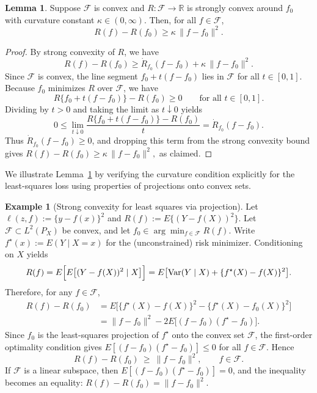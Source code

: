 \documentclass[11pt]{article}
\theoremstyle{plain}
\theoremstyle{definition} %
\newtheorem{example}{Example} %
\newtheorem{lemma}{Lemma}
\newcommand{\Var}{\operatorname{Var}}
\begin{document}
\begin{lemma} \label{lemma::strongconvexity}
Suppose $\mathcal F$ is convex and $R:\mathcal F\to\mathbb R$ is strongly convex around $f_0$ with curvature constant $\kappa\in(0,\infty)$. Then, for all $f\in\mathcal F$,
\[
R(f)-R(f_0)\ge \kappa\,\|f-f_0\|^2.
\]
\end{lemma}
\begin{proof}
By strong convexity of $R$, we have
\[
R(f)-R(f_0)\ge \dot R_{f_0}(f-f_0) + \kappa\,\|f-f_0\|^2.
\]
Since $\mathcal F$ is convex, the line segment $f_0+t(f-f_0)$ lies in $\mathcal F$ for all $t\in[0,1]$. Because $f_0$ minimizes $R$ over $\mathcal F$, we have
\[
R\{f_0+t(f-f_0)\}-R(f_0)\ge 0
\qquad\text{for all }t\in[0,1].
\]
Dividing by $t>0$ and taking the limit as $t\downarrow 0$ yields
\[
0 \le \lim_{t\downarrow 0}\frac{R\{f_0+t(f-f_0)\}-R(f_0)}{t}
= \dot R_{f_0}(f-f_0).
\]
Thus $\dot R_{f_0}(f-f_0)\ge 0$, and dropping this term from the strong convexity bound gives $R(f)-R(f_0)\ge \kappa\,\|f-f_0\|^2,$
as claimed.
\end{proof}

We illustrate Lemma~\ref{lemma::strongconvexity} by verifying the curvature condition explicitly for the least-squares loss using properties of projections onto convex sets.


\begin{example}[Strong convexity for least squares via projection]
Let \(\ell(z,f):=\{y-f(x)\}^2\) and \(R(f):=E\{(Y-f(X))^2\}\). Let \(\mathcal F\subset L^2(P_X)\) be convex, and let
\(f_0\in\arg\min_{f\in\mathcal F} R(f)\). Write \(f^\star(x):=E(Y\mid X=x)\) for the (unconstrained) risk minimizer. Conditioning on \(X\) yields
\[
R(f)
=E\Bigl[E\bigl[(Y-f(X))^2\mid X\bigr]\Bigr]
=E\bigl[\Var(Y\mid X)+\{f^\star(X)-f(X)\}^2\bigr].
\]
Therefore, for any \(f\in\mathcal F\),
\begin{align*}
R(f)-R(f_0)
&=
E\bigl[\{f^\star(X)-f(X)\}^2-\{f^\star(X)-f_0(X)\}^2\bigr]\\
&=
\|f-f_0\|^2
-2E\bigl[(f-f_0)(f^\star-f_0)\bigr].
\end{align*}
Since \(f_0\) is the least-squares projection of \(f^\star\) onto the convex set \(\mathcal F\), the first-order optimality condition gives
\(E[(f-f_0)(f^\star-f_0)]\le 0\) for all \(f\in\mathcal F\). Hence
\[
R(f)-R(f_0)\ \ge\ \|f-f_0\|^2,\qquad f\in\mathcal F.
\]
If \(\mathcal F\) is a linear subspace, then \(E[(f-f_0)(f^\star-f_0)]=0\), and the inequality becomes an equality:
\(R(f)-R(f_0)=\|f-f_0\|^2\).
\end{example}
\end{document}
